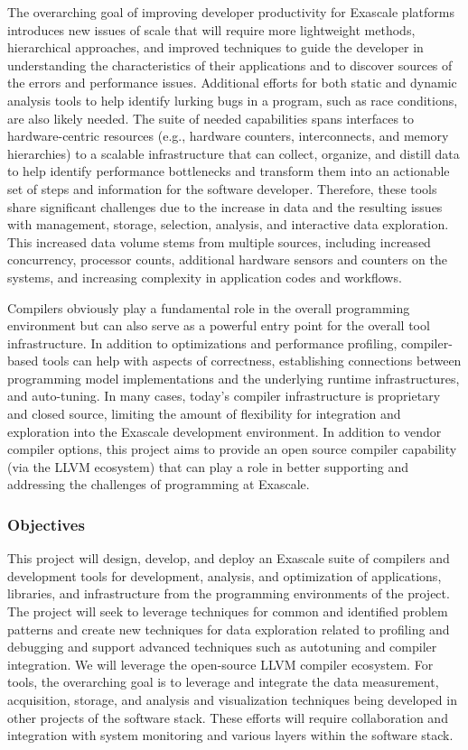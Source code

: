 The overarching goal of improving developer productivity for Exascale platforms introduces new issues of scale that will require more lightweight methods, hierarchical approaches, and improved techniques to guide the developer in understanding the characteristics of their applications and to discover sources of the errors and performance issues. Additional efforts for both static and dynamic analysis tools to help identify lurking bugs in a program, such as race conditions, are also likely needed. The suite of needed capabilities spans interfaces to hardware-centric resources (e.g., hardware counters, interconnects, and memory hierarchies) to a scalable infrastructure that can collect, organize, and distill data to help identify performance bottlenecks and transform them into an actionable set of steps and information for the software developer. Therefore, these tools share significant challenges due to the increase in data and the resulting issues with management, storage, selection, analysis, and interactive data exploration. This increased data volume stems from multiple sources, including increased concurrency, processor counts, additional hardware sensors and counters on the systems, and increasing complexity in application codes and workflows.

Compilers obviously play a fundamental role in the overall programming environment but can also serve as a powerful entry point for the overall tool infrastructure. In addition to optimizations and performance profiling, compiler-based tools can help with aspects of correctness, establishing connections between programming model implementations and the underlying runtime infrastructures, and auto-tuning. In many cases, today's compiler infrastructure is proprietary and closed source, limiting the amount of flexibility for integration and exploration into the Exascale development environment. In addition to vendor compiler options, this project aims to provide an open source compiler capability (via the LLVM ecosystem) that can play a role in better supporting and addressing the challenges of programming at Exascale. 


\subsubsection{Objectives}

This project will design, develop, and deploy an Exascale suite of compilers and development tools for development, analysis, and optimization of applications, libraries, and infrastructure from the programming environments of the project.  
The project will seek to leverage techniques for common and identified problem patterns and create new techniques for data exploration related to profiling and debugging and support advanced techniques such as autotuning and compiler integration. 
We will leverage the open-source LLVM compiler ecosystem. 
For tools, the overarching goal is to leverage and integrate the data measurement, acquisition, storage, and analysis and visualization techniques being developed in other projects of the software stack.  
These efforts will require collaboration and integration with system monitoring and various layers within the software stack.


